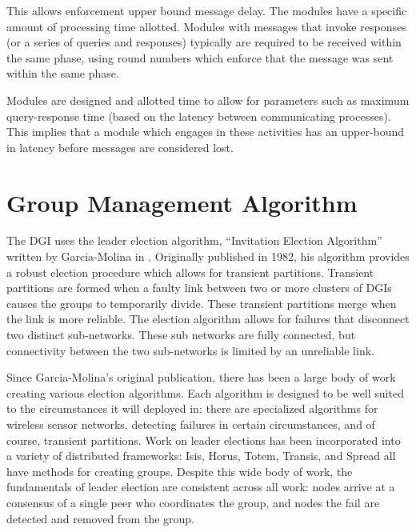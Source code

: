 This allows enforcement upper bound message delay. The modules have a specific amount of processing time allotted. Modules with messages that invoke responses (or a series of queries and responses) typically are required to be received within the same phase, using round numbers which enforce that the message was sent within the same phase.

Modules are designed and allotted time to allow for parameters such as maximum query-response time (based on the latency between communicating processes).  This implies that a module which engages in these activities has an upper-bound in latency before messages are considered lost.

\section{Group Management Algorithm}

The DGI uses the leader election algorithm, ``Invitation Election Algorithm'' written by Garcia-Molina in \cite{INVITATIONELECTION}. Originally published in 1982, his algorithm provides a robust election procedure which allows for transient partitions. Transient partitions are formed when a faulty link between two or more clusters of DGIs causes the groups to temporarily divide. These transient partitions merge when the link is more reliable. The election algorithm allows for failures that disconnect two distinct sub-networks. These sub networks are fully connected, but connectivity between the two sub-networks is limited by an unreliable link.

Since Garcia-Molina's original publication, there has been a large body of work creating various election algorithms. Each algorithm is designed to be well suited to the circumstances it will deployed in: there are specialized algorithms for wireless sensor networks\cite{LE-WSN-1}\cite{LE-WSN-2}, detecting failures in certain circumstances\cite{LE-SPECIALCIRCUMSTANCES-1}\cite{LE-SPECIALCIRCUMSTANCES-2}, and of course, transient partitions. Work on leader elections has been incorporated into a variety of distributed frameworks: Isis\cite{ISISTOOLKIT}, Horus\cite{HORUSTOOLKIT}, Totem\cite{TOTEMTOOLKIT}, Transis\cite{TRANSISTOOLKIT}, and Spread\cite{SPREADTOOLKIT} all have methods for creating groups. Despite this wide body of work, the fundamentals of leader election are consistent across all work: nodes arrive at a consensus of a single peer who coordinates the group, and nodes the fail are detected and removed from the group.


